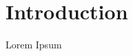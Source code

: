 \documentclass[main.tex]{subfiles}
\begin{document}
\section{Introduction}
Lorem Ipsum
\cite{Irvine}
\end{document}
